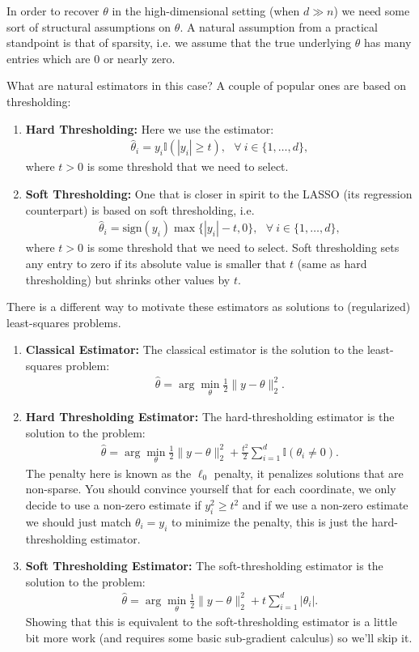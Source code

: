 \documentclass[twoside,12pt]{article}
\begin{document}
In order to recover $\theta$ in the high-dimensional setting (when $d \gg n$) we need some sort of structural assumptions on $\theta$. A natural assumption from a practical standpoint is that of sparsity, i.e. we assume that the true underlying $\theta$ has many entries which are 0 or nearly zero.

What are natural estimators in this case? A couple of popular ones are based on thresholding:
\begin{enumerate}
\item {\bf Hard Thresholding: } Here we use the estimator:
\begin{align*}
\widehat{\theta}_i = y_i \mathbb{I}(|y_i| \geq t),~~~\forall~i \in \{1,\ldots,d\},
\end{align*}
where $t > 0$ is some threshold that we need to select.

\item {\bf Soft Thresholding: } One that is closer in spirit to the LASSO (its regression counterpart) is based on soft thresholding, i.e.
\begin{align*}
\widehat{\theta}_i = \text{sign}(y_i) \max\{|y_i| - t, 0\},~~~\forall~i \in \{1,\ldots,d\},
\end{align*}
where $t > 0$ is some threshold that we need to select. Soft thresholding sets any entry to zero if its absolute value is smaller that $t$ (same as hard thresholding) but shrinks other values by $t$. 
\end{enumerate}

There is a different way to motivate these estimators as solutions to (regularized) least-squares problems.
\begin{enumerate}
\item {\bf Classical Estimator: } The classical estimator is the solution to the least-squares problem:
\begin{align*}
\widehat{\theta} = \arg \min_{\theta} \frac{1}{2} \|y - \theta\|_2^2.
\end{align*}
\item {\bf Hard Thresholding Estimator: } The hard-thresholding estimator is the solution to the problem:
\begin{align*}
\widehat{\theta} = \arg \min_{\theta} \frac{1}{2} \|y - \theta\|_2^2 + \frac{t^2}{2}  \sum_{i=1}^d \mathbb{I}(\theta_i \neq 0).
\end{align*}
The penalty here is known as the $\ell_0$ penalty, it penalizes solutions that are non-sparse. You should convince yourself that for each coordinate, we only decide to use a non-zero estimate if $y_i^2 \geq t^2$ and if we use a non-zero estimate we should just match $\theta_i = y_i$ to minimize the penalty, this is just the hard-thresholding estimator. 
\item {\bf Soft Thresholding Estimator: } The soft-thresholding estimator is the solution to the problem:
\begin{align*}
\widehat{\theta} = \arg \min_{\theta} \frac{1}{2} \|y - \theta\|_2^2 + t \sum_{i=1}^d |\theta_i|.
\end{align*}
Showing that this is equivalent to the soft-thresholding estimator is a little bit more work (and requires some basic sub-gradient calculus) so we'll skip it.
\end{enumerate}
\end{document}
